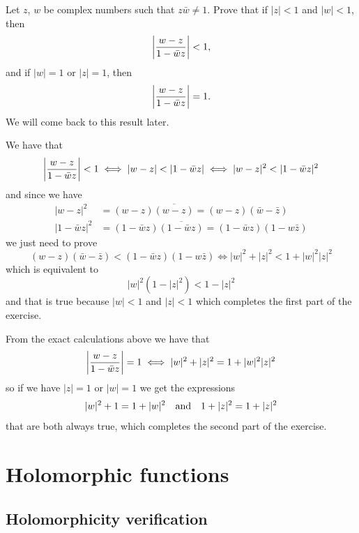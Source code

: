 \documentclass[11pt,a4paper]{article}
\begin{document}
\begin{exercise}
  Let $z$, $w$ be complex numbers such that $z \bar w \neq 1$.
  Prove that if $|z| < 1$ and $|w| < 1$, then
  \[
    \left\lvert\frac{w - z}{1 - \bar w z}\right\rvert < 1,
  \]
  and if $|w| = 1$ or $|z| = 1$, then
  \[
    \left\lvert\frac{w - z}{1 - \bar w z}\right\rvert = 1.
  \]
  We will come back to this result later.
\end{exercise}
\begin{solution}
  We have that
  \[
    \left\lvert\frac{w - z}{1 - \bar w z}\right\rvert < 1 \iff
    |w - z| < |1 - \bar w z| \iff
    |w - z|^2 < |1 - \bar w z|^2
  \]
  and since we have
  \begin{align*}
    |w - z|^2 &= (w - z) \overline{(w - z)} = (w - z)(\bar w - \bar z) \\
    |1 - \bar w z|^2 &= (1 - \bar w z)\overline{(1 - \bar w z)} =
    (1 - \bar w z)(1 - w \bar z)
  \end{align*}
  we just need to prove
  \[
    (w - z)(\bar w - \bar z) < (1 - \bar w z)(1 - w \bar z) \iff
    |w|^2 + |z|^2 < 1 + |w|^2 |z|^2
  \]
  which is equivalent to
  \[
    |w|^2 (1 - |z|^2) < 1 - |z|^2
  \]
  and that is true because $|w| < 1$ and $|z| < 1$ which completes the first 
  part of the exercise.

  From the exact calculations above we have that
  \[
    \left\lvert\frac{w - z}{1 - \bar w z}\right\rvert = 1 \iff
    |w|^2 + |z|^2 = 1 + |w|^2 |z|^2
  \]
  so if we have $|z| = 1$ or $|w| = 1$ we get the expressions
  \[
    |w|^2 + 1 = 1 + |w|^2
    \quad \text{and} \quad
    1 + |z|^2 = 1 + |z|^2
  \]
  that are both always true, which completes the second part of the exercise.
\end{solution}

\newpage

\section{Holomorphic functions}
\subsection{Holomorphicity verification}
\end{document}
